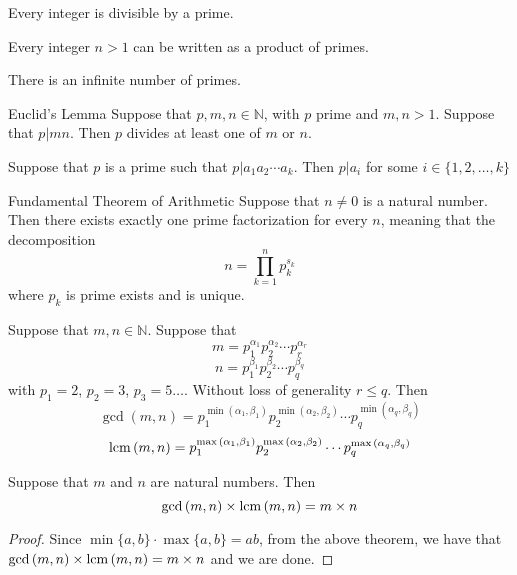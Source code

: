 \documentclass[a4paper]{article}
\begin{document}
\begin{lmm}{}{} Every integer is divisible by a prime. 
\end{lmm}

\begin{lmm}{}{} Every integer $n>1$ can be written as a product of primes. 
\end{lmm}

\begin{thm}{}{} There is an infinite number of primes. 
\end{thm}

\begin{prp}{Euclid's Lemma}{} Suppose that $p,m,n\in\mathbb{N}$, with $p$ prime and $m,n>1$. Suppose that $p|mn$. Then $p$ divides at least one of $m$ or $n$. 
\end{prp}

\begin{prp}{}{} Suppose that $p$ is a prime such that $p|a_1a_2\cdots a_k$. Then $p|a_i$ for some $i\in\{1,2,\dots,k\}$
\end{prp}

\begin{thm}{Fundamental Theorem of Arithmetic}{} Suppose that $n\neq 0$ is a natural number. Then there exists exactly one prime factorization for every $n$, meaning that the decomposition $$n=\prod_{k=1}^np_k^{s_k}$$ where $p_k$ is prime exists and is unique. 
\end{thm}

\begin{thm}{}{} Suppose that $m,n\in\mathbb{N}$. Suppose that 
$$m=p_1^{\alpha_1}p_2^{\alpha_2}\cdots p_r^{\alpha_r}$$
$$n=p_1^{\beta_1}p_2^{\beta_2}\cdots p_q^{\beta_q}$$
with $p_1=2$, $p_2=3$, $p_3=5\dots$. Without loss of generality $r\leq q$. Then $$\gcd{(m,n)}=p_1^{\min{(\alpha_1,\beta_1)}}p_2^{\min{(\alpha_2,\beta_2)}}\cdots p_q^{\min{(\alpha_q,\beta_q)}}$$
$$\operatorname{lcm}{(m,n)}=p_1^{\max{(\alpha_1,\beta_1)}}p_2^{\max{(\alpha_2,\beta_2)}}\cdots p_q^{\max{(\alpha_q,\beta_q)}}$$
\end{thm}

\begin{prp}{}{} Suppose that $m$ and $n$ are natural numbers. Then $$\gcd{(m,n)}\times\operatorname{lcm}{(m,n)}=m\times n$$
\begin{proof} Since $\min\{a,b\}\cdot\max\{a,b\}=ab$, from the above theorem, we have that $\gcd{(m,n)}\times\operatorname{lcm}{(m,n)}=m\times n$ and we are done. 
\end{proof}
\end{prp}
\end{document}
